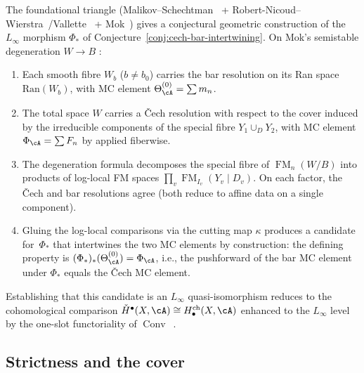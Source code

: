 \begin{remark}
\label{rem:cech-bar-log-path}
The foundational triangle
(Malikov--Schechtman~\cite{MS24} +
Robert-Nicoud--Wierstra~\cite{RNW19}/Vallette~\cite{Val16}
+ Mok~\cite{Mok25}) gives a conjectural geometric
construction of the $L_\infty$ morphism $\Phi_*$ of
Conjecture~\ref{conj:cech-bar-intertwining}. On Mok's semistable
degeneration $W \to B$ \cite[Theorem~5.2.3]{Mok25}:
\begin{enumerate}[label=\textup{(\roman*)}]
\item Each smooth fibre $W_b$ ($b \neq b_0$) carries the bar
 resolution on its Ran space $\mathrm{Ran}(W_b)$, with MC element
 $\Theta^{(0)}_\cA = \sum m_n$.
\item The total space $W$ carries a \v{C}ech resolution with respect
 to the cover induced by the irreducible components of the special
 fibre $Y_1 \cup_D Y_2$, with MC element
 $\Phi_\cA = \sum F_n$ by \cite{MS24} applied fiberwise.
\item The degeneration formula \cite[Corollary~5.3.4]{Mok25}
 decomposes the special fibre of
 $\operatorname{FM}_n(W/B)$ into products of log-local
 FM spaces $\prod_v \operatorname{FM}_{I_v}(Y_v \mathbin{|} D_v)$.
 On each factor, the \v{C}ech and bar resolutions agree
 \textup{(}both reduce to affine data on a single component\textup{)}.
\item Gluing the log-local comparisons via the cutting map
 $\kappa$ \cite[Lemma~5.3.1]{Mok25} produces a candidate
 for~$\Phi_*$ that intertwines the two MC elements by
 construction: the defining property is
 $(\Phi_*)_*(\Theta^{(0)}_\cA) = \Phi_\cA$, i.e., the
 pushforward of the bar MC element under $\Phi_*$ equals the
 \v{C}ech MC element.
\end{enumerate}
Establishing that this candidate is an $L_\infty$
quasi-isomorphism reduces to the cohomological comparison
$\check{H}^\bullet(X,\cA) \cong H^{\mathrm{ch}}_\bullet(X,\cA)$
enhanced to the $L_\infty$ level by the one-slot functoriality
of $\operatorname{Conv}$~\cite[Theorem~5.1]{RNW19}.
\end{remark}

\subsection{Strictness and the cover}
\label{subsec:strictness-cover}

